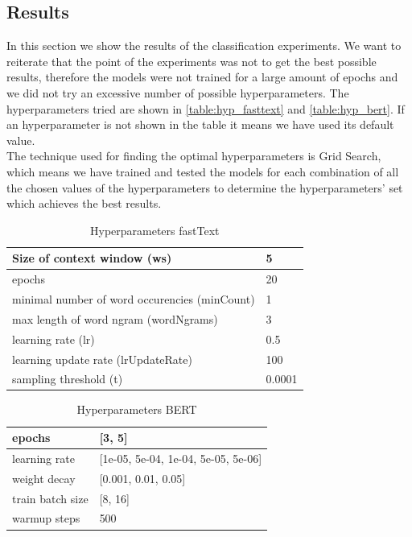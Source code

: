 \subsection{Results}
In this section we show the results of the classification experiments. We want to reiterate that the point of the experiments was not to get the best possible results, therefore the models were not trained for a large amount of epochs and we did not try an excessive number of possible hyperparameters.
The hyperparameters tried are shown in \autoref{table:hyp_fasttext} and \autoref{table:hyp_bert}. If an hyperparameter is not shown in the table it means we have used its default value. \\
The technique used for finding the optimal hyperparameters is Grid Search, which means we have trained and tested the models for each combination of all the chosen values of the hyperparameters to determine the hyperparameters' set which achieves the best results.

\begin{table}[h]
  \begin{tabular}{|l|l|}
  \hline
  Size of context window (ws)                   & 5      \\ \hline
  epochs                                        & 20     \\ \hline
  minimal number of word occurencies (minCount) & 1      \\ \hline
  max length of word ngram (wordNgrams)         & 3      \\ \hline
  learning rate (lr)                            & 0.5    \\ \hline
  learning update rate (lrUpdateRate)           & 100    \\ \hline
  sampling threshold (t)                        & 0.0001 \\ \hline
  \end{tabular}
  \caption{Hyperparameters fastText}\label{table:hyp_fasttext}
\end{table}

\begin{table}[h]
  \begin{tabular}{|l|l|}
  \hline
  epochs           & {[}3, 5{]}                              \\ \hline
  learning rate    & {[}1e-05, 5e-04, 1e-04, 5e-05, 5e-06{]} \\ \hline
  weight decay     & {[}0.001, 0.01, 0.05{]}                 \\ \hline
  train batch size & {[}8, 16{]}                             \\ \hline
  warmup steps     & 500                                     \\ \hline
  \end{tabular}
  \caption{Hyperparameters BERT}\label{table:hyp_bert}
  \end{table}

